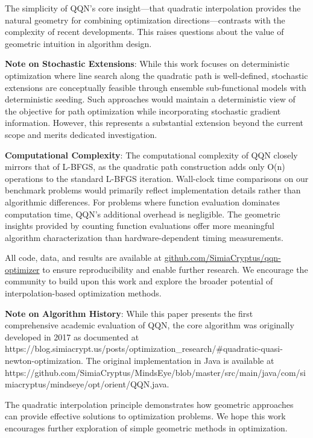 The simplicity of QQN's core insight---that quadratic interpolation provides the natural geometry for combining
optimization directions---contrasts with the complexity of recent developments. This raises questions about the value of
geometric intuition in algorithm design.

\textbf{Note on Stochastic Extensions}: While this work focuses on deterministic optimization where line search along the
quadratic path is well-defined, stochastic extensions are conceptually feasible through ensemble sub-functional models
with deterministic seeding. Such approaches would maintain a deterministic view of the objective for path optimization
while incorporating stochastic gradient information. However, this represents a substantial extension beyond the current
scope and merits dedicated investigation.

\textbf{Computational Complexity}: The computational complexity of QQN closely mirrors that of L-BFGS, as the quadratic path
construction adds only O(n) operations to the standard L-BFGS iteration. Wall-clock time comparisons on our benchmark
problems would primarily reflect implementation details rather than algorithmic differences. For problems where function
evaluation dominates computation time, QQN's additional overhead is negligible. The geometric insights provided by
counting function evaluations offer more meaningful algorithm characterization than hardware-dependent timing
measurements.

All code, data, and results are available at \href{https://github.com/SimiaCryptus/qqn-optimizer/}{github.com/SimiaCryptus/qqn-optimizer} to
ensure reproducibility and enable further research. We encourage the community to build upon this work and explore the
broader potential of interpolation-based optimization methods.

\textbf{Note on Algorithm History}: While this paper presents the first comprehensive academic evaluation of QQN, the core
algorithm was originally developed in 2017 as documented at
https://blog.simiacrypt.us/posts/optimization\_research/\#quadratic-quasi-newton-optimization. The original implementation
in Java is available at https://github.com/SimiaCryptus/MindsEye/blob/master/src/main/java/com/simiacryptus/mindseye/opt/orient/QQN.java.

The quadratic interpolation principle demonstrates how geometric approaches can provide
effective solutions to optimization problems. We hope this work encourages further
exploration of simple geometric methods in optimization.

